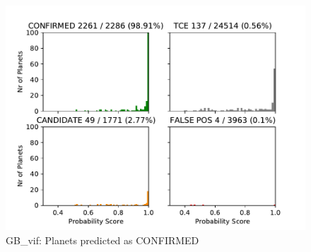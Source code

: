 
\begin{figure}[H]
                \begin{mdframed}[linecolor=green]
                \centering
                \includegraphics[width = 1\textwidth,height=.4\textheight]{data/GB_vif_pred_confirm.pdf}
                \caption{GB\_vif: Planets predicted as CONFIRMED}
                \label{fig:data/GB_vif_pred_confirm}
                \end{mdframed}
                \end{figure}